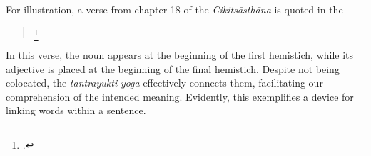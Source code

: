 For illustration, a verse from chapter 18 of the \emph{Cikitsāsthāna} is quoted in the \SS---

\begin{quote}
	
	\footnote{.}
	
\end{quote}


In this verse, the noun  appears at the beginning of the first hemistich, while its adjective  is placed at the beginning of the final hemistich. Despite not being colocated, the \emph{tantrayukti} \emph{yoga} effectively connects them, facilitating our comprehension of the intended meaning. Evidently, this exemplifies a device for linking words within a sentence.


